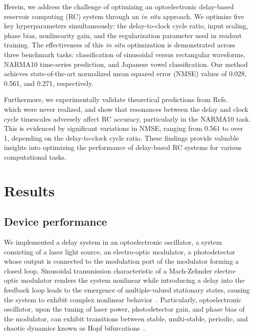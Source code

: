 \documentclass{WileyMSP-template}
\begin{document}
Herein, we address the challenge of optimizing an optoelectronic delay-based reservoir computing (RC) system through an \emph{in situ} approach. We optimize five key hyperparameters simultaneously: the delay-to-clock cycle ratio, input scaling, phase bias, nonlinearity gain, and the regularization parameter used in readout training. The effectiveness of this \emph{in situ} optimization is demonstrated across three benchmark tasks: classification of sinusoidal versus rectangular waveforms, NARMA10 time-series prediction, and Japanese vowel classification. Our method achieves state-of-the-art normalized mean squared error (NMSE) values of 0.028, 0.561, and 0.271, respectively.

Furthermore, we experimentally validate theoretical predictions from Refs. ~\cite{ref:koster2021,ref:hulser2022} which were never realized, and show that resonances between the delay and clock cycle timescales adversely affect RC accuracy, particularly in the NARMA10 task. This is evidenced by significant variations in NMSE, ranging from 0.561 to over 1, depending on the delay-to-clock cycle ratio. These findings provide valuable insights into optimizing the performance of delay-based RC systems for various computational tasks.

\section{Results}
\subsection{Device performance}
We implemented a delay system in an optoelectronic oscillator, a system consisting of a laser light source, an electro-optic modulator, a photodetector whose output is connected to the modulation port of the modulator forming a closed loop. 
Sinusoidal transmission characteristic of a Mach-Zehnder electro-optic modulator renders the system nonlinear while introducing a delay into the feedback loop leads to the emergence of multiple-valued stationary states, causing the system to exhibit complex nonlinear behavior~\cite{ref:ikeda1979,ref:ikeda1980}.
Particularly, optoelectronic oscillator, upon the tuning of laser power, photodetector gain, and phase bias of the modulator, can exhibit transitions between stable, multi-stable, periodic, and chaotic dynamics known as Hopf bifurcations~\cite{ref:neyer1982,ref:erneux2004,ref:larger2004}.
\end{document}
